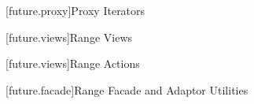 
[future.proxy]{Proxy Iterators}

\pnum


[future.views]{Range Views}

\pnum


[future.views]{Range Actions}

\pnum


[future.facade]{Range Facade and Adaptor Utilities}

\pnum


